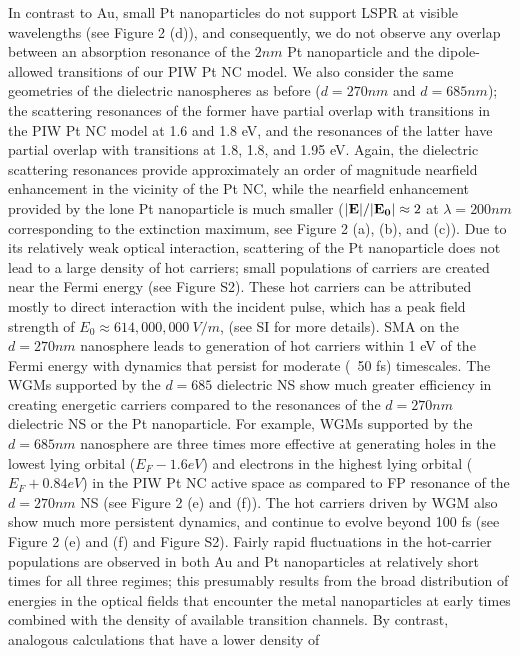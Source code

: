 \documentclass[journal=jpclcd,manuscript=article]{achemso}
\begin{document}
In contrast to Au, small Pt nanoparticles do not support LSPR at visible wavelengths (see Figure 2 (d)), and consequently, we do not
observe any overlap between an absorption resonance of the $2nm$ Pt nanoparticle and the dipole-allowed 
transitions of our PIW Pt NC model.  We also consider
the same geometries of the dielectric nanospheres as before ($d=270nm$ and $d=685 nm$); the scattering resonances of the former have partial overlap with transitions in the PIW Pt NC model at 1.6 and 1.8 eV, and the resonances of the latter have partial 
overlap with transitions at 1.8, 1.8, and 1.95 eV.  Again, the dielectric scattering resonances provide 
approximately an order of magnitude 
nearfield enhancement in the vicinity of the Pt NC, while the nearfield enhancement provided by the lone 
Pt nanoparticle is much smaller ($|{\bf E}|/|{\bf E_0}| \approx 2$ at $\lambda=200nm$ corresponding to the extinction maximum, see Figure 2 (a), (b), and (c)).
Due to its relatively weak optical interaction, scattering of the Pt nanoparticle does not lead to a large density of hot carriers; small populations
of carriers are created near the Fermi energy (see Figure S2).  These hot carriers can be attributed mostly to direct interaction with the 
incident pulse, which has a peak field strength of $E_0 \approx 614,000,000 \: V/m$, (see SI for more details).
SMA on the $d=270nm$ nanosphere
leads to generation of hot carriers within 1 eV of the Fermi energy with dynamics that persist for moderate (~50 fs) timescales.
The WGMs supported by the $d=685$ dielectric NS show much greater efficiency in creating energetic carriers compared
to the resonances of the $d=270nm$ dielectric NS or the Pt nanoparticle.  For example, WGMs supported by the $d=685nm$ nanosphere are three times
more effective at generating holes in the lowest lying orbital ($E_F - 1.6 eV$) 
and electrons in the highest 
lying orbital ($E_F + 0.84 eV$) in the PIW Pt NC active space as compared to FP resonance of the $d=270nm$ NS (see Figure 2 (e) and (f)).  
The hot carriers driven by WGM also show much more persistent dynamics, and continue to evolve beyond 100 fs (see Figure 2 (e) and (f) and Figure S2).  Fairly rapid fluctuations in the hot-carrier populations 
are observed in both Au and Pt nanoparticles at relatively short times for all three regimes; this presumably results from the
broad distribution of energies in the optical fields that encounter the metal nanoparticles 
at early times combined with
the density of available transition channels.  By contrast, analogous calculations that have a lower density of
\end{document}
